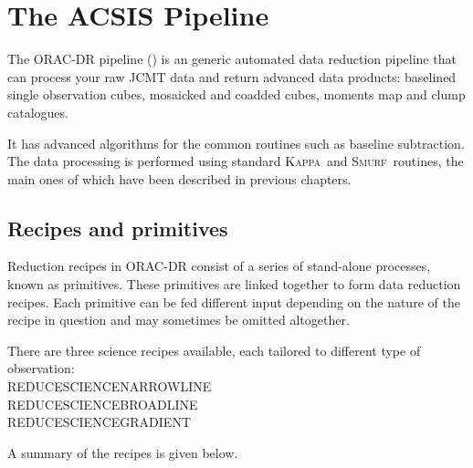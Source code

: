 \documentclass[twoside,11pt]{article}
\newcommand{\xref}[3]{#1}
\newcommand{\xlabel}[1]{}
\renewcommand{\_}{\texttt{\symbol{95}}}
\newcommand{\Kappa}{\xref{\textsc{Kappa}}{sun95}{}}
\newcommand{\smurf}{\xref{\textsc{Smurf}}{sun258}{}}
\begin{document}
\newpage
\section{\xlabel{pipeline}The ACSIS Pipeline}
\label{sec:pipe}
The ORAC-DR pipeline (\cite{oracdr}) is an generic automated data reduction pipeline that can process your raw JCMT data and return advanced data products: baselined single observation cubes, mosaicked and coadded cubes, moments map and clump catalogues.  

It has advanced algorithms for the common routines such as baseline subtraction. The data processing is performed using standard \Kappa\ and \smurf\ routines, the main ones of which have been described in previous chapters. 

\subsection{\xlabel{recipes}Recipes and primitives}
\label{sec:recipes}
Reduction recipes in ORAC-DR consist of a series of stand-alone processes, known as primitives. These primitives are linked together to form data reduction recipes. Each primitive can be fed different input depending on the nature of the recipe in question and may sometimes be omitted altogether.

 There are three science recipes available, each tailored to different type of observation:\\
REDUCE\_SCIENCE\_NARROWLINE\\
REDUCE\_SCIENCE\_BROADLINE\\
REDUCE\_SCIENCE\_GRADIENT

A summary of the recipes is given below.
\end{document}

